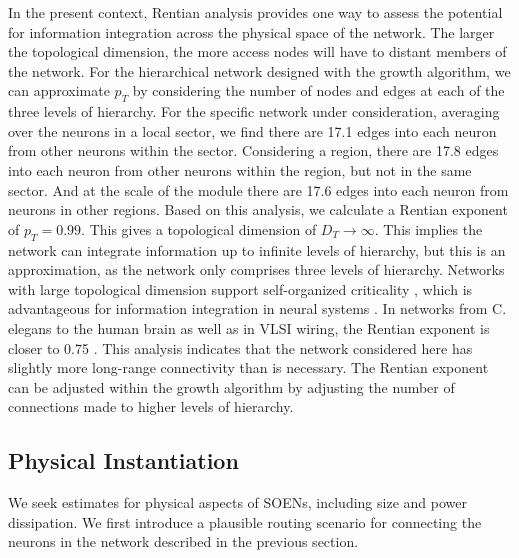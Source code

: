 \documentclass[twocolumn]{article}
\begin{document}
In the present context, Rentian analysis provides one way to assess the potential for information integration across the physical space of the network. The larger the topological dimension, the more access nodes will have to distant members of the network. For the hierarchical network designed with the growth algorithm, we can approximate $p_T$ by considering the number of nodes and edges at each of the three levels of hierarchy. For the specific network under consideration, averaging over the neurons in a local sector, we find there are 17.1 edges into each neuron from other neurons within the sector. Considering a region, there are 17.8 edges into each neuron from other neurons within the region, but not in the same sector. And at the scale of the module there are 17.6 edges into each neuron from neurons in other regions. Based on this analysis, we calculate a Rentian exponent of $p_T = 0.99$. This gives a topological dimension of $D_T \rightarrow \infty$. This implies the network can integrate information up to infinite levels of hierarchy, but this is an approximation, as the network only comprises three levels of hierarchy. Networks with large topological dimension support self-organized criticality \cite{be2007,rusp2011}, which is advantageous for information integration in neural systems \cite{be2007,kism2009,shya2009,ch2010,rusp2011}. In networks from C. elegans to the human brain as well as in VLSI wiring, the Rentian exponent is closer to 0.75 \cite{bagr2010}. This analysis indicates that the network considered here has slightly more long-range connectivity than is necessary. The Rentian exponent can be adjusted within the growth algorithm by adjusting the number of connections made to higher levels of hierarchy.  
	
\subsection{\label{sec:physicalInstantiation}Physical Instantiation}
We seek estimates for physical aspects of SOENs, including size and power dissipation. We first introduce a plausible routing scenario for connecting the neurons in the network described in the previous section. 
\end{document}
